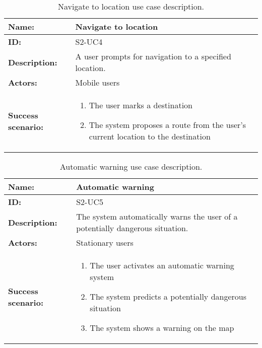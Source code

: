 \begin{table}[htbp]
    \centering
    \begin{tabularx}{\textwidth}{lX}
        \toprule
        \textbf{Name:}  & Navigate to location \\ \midrule
        \textbf{ID:}    & S2-UC4 \\ \midrule
        \textbf{Description:} & A user prompts for navigation to a specified location. \\ \midrule
        \textbf{Actors:} & Mobile users \\ \midrule
        \textbf{Success scenario:} & 
        \begin{enumerate}
            \item The user marks a destination
            \item The system proposes a route from the user's current location to the destination
        \end{enumerate}
        \\ \bottomrule
    \end{tabularx}
    \caption{Navigate to location use case description.}
    \label{tab:s2-uc4}
\end{table}

\begin{table}[htbp]
    \centering
    \begin{tabularx}{\textwidth}{lX}
        \toprule
        \textbf{Name:}  & Automatic warning \\ \midrule
        \textbf{ID:}    & S2-UC5 \\ \midrule
        \textbf{Description:} & The system automatically warns the user of a potentially dangerous situation. \\ \midrule
        \textbf{Actors:} & Stationary users \\ \midrule
        \textbf{Success scenario:} & 
        \begin{enumerate}
            \item The user activates an automatic warning system
            \item The system predicts a potentially dangerous situation
            \item The system shows a warning on the map
        \end{enumerate}
        \\ \bottomrule
    \end{tabularx}
    \caption{Automatic warning use case description.}
    \label{tab:s2-uc5}
\end{table}

